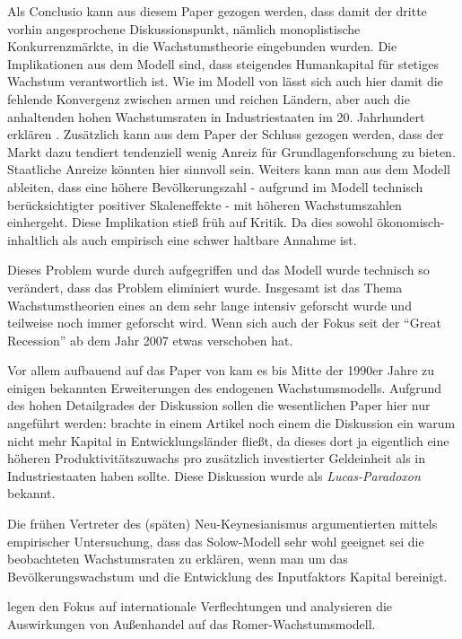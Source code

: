 Als Conclusio kann aus diesem Paper gezogen werden, dass damit der dritte vorhin angesprochene Diskussionspunkt, nämlich monoplistische Konkurrenzmärkte, in die Wachstumstheorie eingebunden wurden. Die Implikationen aus dem Modell sind, dass steigendes Humankapital für stetiges Wachstum verantwortlich ist. Wie im Modell von \textcite{Lucas1988} lässt sich auch hier damit die fehlende Konvergenz zwischen armen und reichen Ländern, aber auch die anhaltenden hohen Wachstumsraten in Industriestaaten im 20. Jahrhundert erklären \parencite{Romer1990}. Zusätzlich kann aus dem Paper der Schluss gezogen werden, dass der Markt dazu tendiert tendenziell wenig Anreiz für Grundlagenforschung zu bieten. Staatliche Anreize könnten hier sinnvoll sein. Weiters kann man aus dem Modell ableiten, dass eine höhere Bevölkerungszahl - aufgrund im Modell technisch berücksichtigter positiver Skaleneffekte - mit höheren Wachstumszahlen einhergeht. Diese Implikation stieß früh auf Kritik. Da dies sowohl ökonomisch-inhaltlich als auch empirisch eine schwer haltbare Annahme ist.

Dieses Problem wurde durch \textcite{Jones1995} aufgegriffen und das Modell wurde technisch so verändert, dass das Problem eliminiert wurde. Insgesamt ist das Thema Wachstumstheorien eines an dem sehr lange intensiv geforscht wurde und teilweise noch immer geforscht wird. Wenn sich auch der Fokus seit der "`Great Recession"' ab dem Jahr 2007 etwas verschoben hat.

Vor allem aufbauend auf das Paper von \textcite{Romer1990} kam es bis Mitte der 1990er Jahre zu einigen bekannten Erweiterungen des endogenen Wachstumsmodells. Aufgrund des hohen Detailgrades der Diskussion sollen die wesentlichen Paper hier nur angeführt werden: \textcite{Lucas1990} brachte in einem Artikel noch einem die Diskussion ein warum nicht mehr Kapital in Entwicklungsländer fließt, da dieses dort ja eigentlich eine höheren Produktivitätszuwachs pro zusätzlich investierter Geldeinheit als in Industriestaaten haben sollte. Diese Diskussion wurde als \textit{Lucas-Paradoxon} bekannt.

Die frühen Vertreter des (späten) Neu-Keynesianismus \textcite{Mankiw1992} argumentierten mittels empirischer Untersuchung, dass das Solow-Modell sehr wohl geeignet sei die beobachteten Wachstumsraten zu erklären, wenn man um das Bevölkerungswachstum und die Entwicklung des Inputfaktors Kapital bereinigt.

\textcite{Grossman1991a, Grossman1991b} legen den Fokus auf internationale Verflechtungen und analysieren die Auswirkungen von Außenhandel auf das Romer-Wachstumsmodell.

